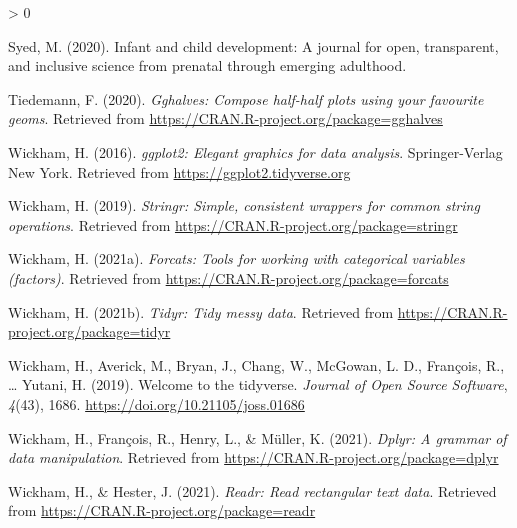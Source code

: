 \documentclass[
  english,
  man]{apa6}
\newlength{\cslhangindent}
\newenvironment{CSLReferences}[2] %
 {%
  \setlength{\parindent}{0pt}
  \ifodd #1 \everypar{\setlength{\hangindent}{\cslhangindent}}\ignorespaces\fi
  \ifnum #2 > 0
  \setlength{\parskip}{#2\baselineskip}
  \fi
 }%
 {}
\begin{document}
\begin{CSLReferences}{1}{0}
\leavevmode\hypertarget{ref-syed2020infant}{}%
Syed, M. (2020). Infant and child development: A journal for open, transparent, and inclusive science from prenatal through emerging adulthood.

\leavevmode\hypertarget{ref-R-gghalves}{}%
Tiedemann, F. (2020). \emph{Gghalves: Compose half-half plots using your favourite geoms}. Retrieved from \url{https://CRAN.R-project.org/package=gghalves}

\leavevmode\hypertarget{ref-R-ggplot2}{}%
Wickham, H. (2016). \emph{ggplot2: Elegant graphics for data analysis}. Springer-Verlag New York. Retrieved from \url{https://ggplot2.tidyverse.org}

\leavevmode\hypertarget{ref-R-stringr}{}%
Wickham, H. (2019). \emph{Stringr: Simple, consistent wrappers for common string operations}. Retrieved from \url{https://CRAN.R-project.org/package=stringr}

\leavevmode\hypertarget{ref-R-forcats}{}%
Wickham, H. (2021a). \emph{Forcats: Tools for working with categorical variables (factors)}. Retrieved from \url{https://CRAN.R-project.org/package=forcats}

\leavevmode\hypertarget{ref-R-tidyr}{}%
Wickham, H. (2021b). \emph{Tidyr: Tidy messy data}. Retrieved from \url{https://CRAN.R-project.org/package=tidyr}

\leavevmode\hypertarget{ref-R-tidyverse}{}%
Wickham, H., Averick, M., Bryan, J., Chang, W., McGowan, L. D., François, R., \ldots{} Yutani, H. (2019). Welcome to the {tidyverse}. \emph{Journal of Open Source Software}, \emph{4}(43), 1686. \url{https://doi.org/10.21105/joss.01686}

\leavevmode\hypertarget{ref-R-dplyr}{}%
Wickham, H., François, R., Henry, L., \& Müller, K. (2021). \emph{Dplyr: A grammar of data manipulation}. Retrieved from \url{https://CRAN.R-project.org/package=dplyr}

\leavevmode\hypertarget{ref-R-readr}{}%
Wickham, H., \& Hester, J. (2021). \emph{Readr: Read rectangular text data}. Retrieved from \url{https://CRAN.R-project.org/package=readr}

\end{CSLReferences}

\endgroup
\end{document}
